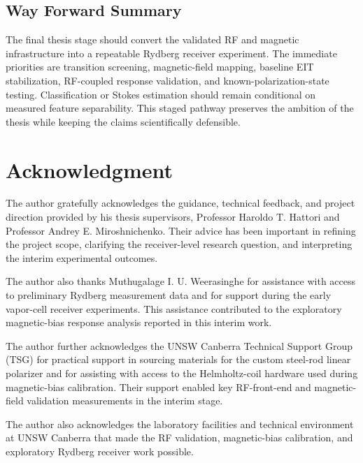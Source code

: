 \documentclass{ieeeaccess}
\begin{document}
\subsection{Way Forward Summary}
\label{subsec:way_forward_summary}

The final thesis stage should convert the validated RF and magnetic infrastructure into a repeatable Rydberg receiver experiment. The immediate priorities are transition screening, magnetic-field mapping, baseline EIT stabilization, RF-coupled response validation, and known-polarization-state testing. Classification or Stokes estimation should remain conditional on measured feature separability. This staged pathway preserves the ambition of the thesis while keeping the claims scientifically defensible.


\section*{Acknowledgment}
\label{sec:acknowledgment}

The author gratefully acknowledges the guidance, technical feedback, and project direction provided by his thesis supervisors, Professor Haroldo T. Hattori and Professor Andrey E. Miroshnichenko. Their advice has been important in refining the project scope, clarifying the receiver-level research question, and interpreting the interim experimental outcomes.

The author also thanks Muthugalage I. U. Weerasinghe for assistance with access to preliminary Rydberg measurement data and for support during the early vapor-cell receiver experiments. This assistance contributed to the exploratory magnetic-bias response analysis reported in this interim work.

The author further acknowledges the UNSW Canberra Technical Support Group (TSG) for practical support in sourcing materials for the custom steel-rod linear polarizer and for assisting with access to the Helmholtz-coil hardware used during magnetic-bias calibration. Their support enabled key RF-front-end and magnetic-field validation measurements in the interim stage.

The author also acknowledges the laboratory facilities and technical environment at UNSW Canberra that made the RF validation, magnetic-bias calibration, and exploratory Rydberg receiver work possible.
\end{document}

